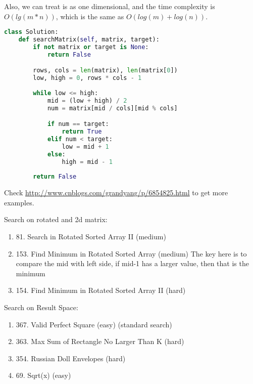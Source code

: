 \documentclass[main.tex]{subfiles}
\begin{document}
\begin{enumerate}
Also, we can treat is as one dimensional, and the time complexity is $O(lg(m*n))$, which is the same as $O(log(m)+log(n))$.
\begin{lstlisting}[language = Python]
class Solution:
    def searchMatrix(self, matrix, target):
        if not matrix or target is None:
            return False

        rows, cols = len(matrix), len(matrix[0])
        low, high = 0, rows * cols - 1
        
        while low <= high:
            mid = (low + high) / 2
            num = matrix[mid / cols][mid % cols]

            if num == target:
                return True
            elif num < target:
                low = mid + 1
            else:
                high = mid - 1
        
        return False
\end{lstlisting}
\end{enumerate}

Check \url{http://www.cnblogs.com/grandyang/p/6854825.html} to get more examples.

Search on rotated and 2d matrix:
\begin{enumerate}
    \item 81. Search in Rotated Sorted Array II (medium) 
    \item 153. Find Minimum in Rotated Sorted Array (medium) The key here is to compare the mid with left side, if mid-1 has a larger value, then that is the minimum 
    \item 154. Find Minimum in Rotated Sorted Array II (hard)
\end{enumerate}
Search on Result Space:
\begin{enumerate}
    \item 367. Valid Perfect Square (easy) (standard search)
    \item 363. Max Sum of Rectangle No Larger Than K (hard)
    \item 354. Russian Doll Envelopes (hard)
    \item 69. Sqrt(x) (easy)
\end{enumerate}


% 
%  
 
\end{document}

